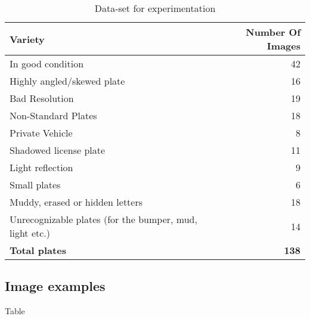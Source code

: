 \documentclass{standalone}
\begin{document}
\begin{table}    
    \caption{Data-set for experimentation}
    \label{table:Variety}
    \begin{tabular}{|l|r|}
    \hline
    {\bf Variety}  &  {\bf Number Of Images} \\ 
    \hline 
    In good condition &  42 \\ 
    Highly angled/skewed plate & 16 \\
    Bad Resolution & 19 \\ 
    Non-Standard Plates &  18\\    
    Private Vehicle & 8 \\
    Shadowed license plate & 11 \\    
    Light reflection & 9 \\
    Small plates & 6\\
    Muddy, erased or hidden letters & 18 \\
    Unrecognizable plates (for the bumper, mud, light etc.) & 14  \\
    \hline
    {\bf Total plates} & {\bf 138} \\
    \hline
    \end{tabular}
\end{table}

\subsection{Image examples}
Table 
\end{document}
